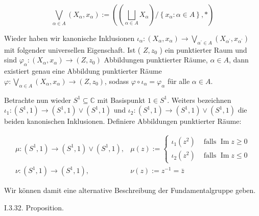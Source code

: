 \documentclass[10pt, letterpaper]{article}
\begin{document}
$$
\bigvee_{\alpha \in A}\left(X_{\alpha}, x_{\alpha}\right):=\left(\left(\bigsqcup_{\alpha \in A} X_{\alpha}\right) /\left\{x_{\alpha}: \alpha \in A\right\}, *\right)
$$

Wieder haben wir kanonische Inklusionen $\iota_{\alpha}:\left(X_{\alpha}, x_{\alpha}\right) \rightarrow \bigvee_{\alpha^{\prime} \in A}\left(X_{\alpha^{\prime}}, x_{\alpha^{\prime}}\right)$ mit folgender universellen Eigenschaft. Ist ( $Z, z_{0}$ ) ein punktierter Raum und sind $\varphi_{\alpha}:\left(X_{\alpha}, x_{\alpha}\right) \rightarrow\left(Z, z_{0}\right)$ Abbildungen punktierter Räume, $\alpha \in A$, dann existiert genau eine Abbildung punktierter Räume $\varphi: \bigvee_{\alpha \in A}\left(X_{\alpha}, x_{\alpha}\right) \rightarrow\left(Z, z_{0}\right)$, sodass $\varphi \circ \iota_{\alpha}=\varphi_{\alpha}$ für alle $\alpha \in A$.

Betrachte nun wieder $S^{1} \subseteq \mathbb{C}$ mit Basispunkt $1 \in S^{1}$. Weiters bezeichnen $\iota_{1}:\left(S^{1}, 1\right) \rightarrow\left(S^{1}, 1\right) \vee\left(S^{1}, 1\right)$ und $\iota_{2}:\left(S^{1}, 1\right) \rightarrow\left(S^{1}, 1\right) \vee\left(S^{1}, 1\right)$ die beiden kanonischen Inklusionen. Definiere Abbildungen punktierter Räume:

$$
\begin{array}{ll}
\mu:\left(S^{1}, 1\right) \rightarrow\left(S^{1}, 1\right) \vee\left(S^{1}, 1\right), & \mu(z):= \begin{cases}\iota_{1}\left(z^{2}\right) & \text { falls } \operatorname{Im} z \geq 0 \\
\iota_{2}\left(z^{2}\right) & \text { falls } \operatorname{Im} z \leq 0\end{cases} \\
\nu:\left(S^{1}, 1\right) \rightarrow\left(S^{1}, 1\right), & \nu(z):=z^{-1}=\bar{z}
\end{array}
$$

Wir können damit eine alternative Beschreibung der Fundamentalgruppe geben.



I.3.32. Proposition. 
\end{document}
